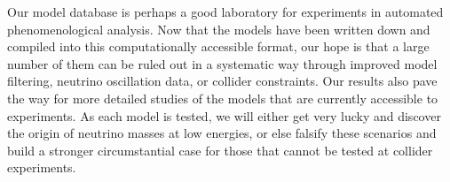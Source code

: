 Our model database is perhaps a good laboratory for experiments in automated
phenomenological analysis. Now that the models have been written down and
compiled into this computationally accessible format, our hope is that a large
number of them can be ruled out in a systematic way through improved model
filtering, neutrino oscillation data, or collider constraints. Our results also
pave the way for more detailed studies of the models that are currently
accessible to experiments. As each model is tested, we will either get very
lucky and discover the origin of neutrino masses at low energies, or else
falsify these scenarios and build a stronger circumstantial case for those that
cannot be tested at collider experiments.
